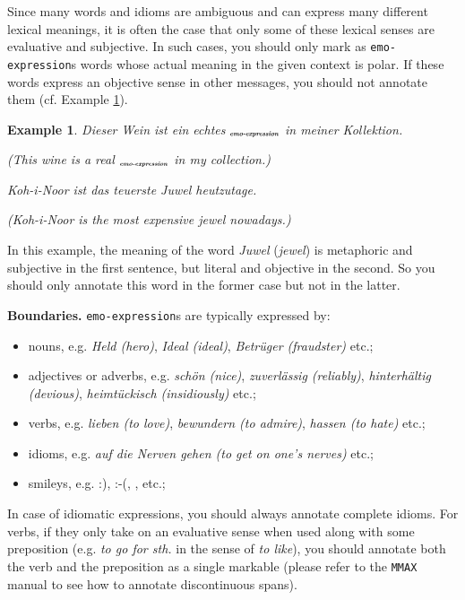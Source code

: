 \documentclass[11pt,a4paper]{article}
\theoremstyle{mytheoremstyle}
\newtheorem{exmp}{Example}[section]
\newcommand{\mtag}[2]{{\upshape[\emph{#2}\upshape]$_{\textrm{\bfseries\emph{\tiny
        #1}}}$}}
\newcommand{\emoexpression}[2][]{\mtag{emo-\-ex\-pression\ifstrempty{#1}{}{:#1}}{#2}}
\begin{document}
Since many words and idioms are ambiguous and can express many
different lexical meanings, it is often the case that only some of
these lexical senses are evaluative and subjective.  In such cases,
you should only mark as \texttt{emo-expression}s words whose actual
meaning in the given context is polar.  If these words express an
objective sense in other messages, you should not annotate them
(cf. Example \ref{exmp:emo-expression-jewel}).
\begin{exmp}
  Dieser Wein ist ein echtes \emoexpression{Juwel} in meiner
  Kollektion.

  (This wine is a real \emoexpression{jewel} in my collection.)

  Koh-i-Noor ist das teuerste Juwel heutzutage.

  (Koh-i-Noor is the most expensive jewel nowadays.)\label{exmp:emo-expression-jewel}
\end{exmp}
\noindent{}In this example, the meaning of the word \textit{Juwel}
(\textit{jewel}) is metaphoric and subjective in the first sentence,
but literal and objective in the second.  So you should only annotate
this word in the former case but not in the latter.

\noindent\textbf{Boundaries.} \texttt{emo-expression}s are typically
expressed by:
\begin{itemize}
  \item nouns, e.g. \textit{Held (hero)}, \textit{Ideal (ideal)},
    \textit{Betr\"uger (fraudster)} etc.;

  \item adjectives or adverbs, e.g. \textit{sch\"on (nice)},
    \textit{zuverl\"assig (reliably)}, \textit{hinterh\"altig
      (devious)}, \textit{heimt\"uckisch (insidiously)} etc.;

  \item verbs, e.g. \textit{lieben (to love)}, \textit{bewundern (to
    admire)}, \textit{hassen (to hate)} etc.;

  \item idioms, e.g. \textit{auf die Nerven gehen (to get on one's
    nerves)} etc.;

  \item smileys, e.g. :), :-(, \smiley{}, \frownie{} etc.;
\end{itemize}
In case of idiomatic expressions, you should always annotate complete
idioms.  For verbs, if they only take on an evaluative sense when used
along with some preposition (e.g. \textit{to go for sth.} in the sense
of \textit{to like}), you should annotate both the verb and the
preposition as a single markable (please refer to the \texttt{MMAX}
manual to see how to annotate discontinuous spans).
\end{document}
